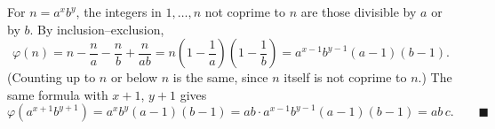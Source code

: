 For $n=a^xb^y$, the integers in $1,\dots,n$ not coprime to $n$ are those divisible by $a$ or by $b$. By inclusion--exclusion,
\[\varphi(n)=n-\dfrac {n}{a}-\dfrac {n}{b}+\dfrac {n}{ab}=n\left(1-\dfrac{1}{a}\right)\left(1-\dfrac{1}{b}\right)=a^{x-1}b^{y-1}(a-1)(b-1).\]
(Counting up to $n$ or below $n$ is the same, since $n$ itself is not coprime to $n$.) The same formula with $x+1$, $y+1$ gives
\[\varphi\left(a^{x+1}b^{y+1}\right)=a^{x}b^{y}(a-1)(b-1)=ab\cdot a^{x-1}b^{y-1}(a-1)(b-1)=ab\,c.\qquad\blacksquare\]
